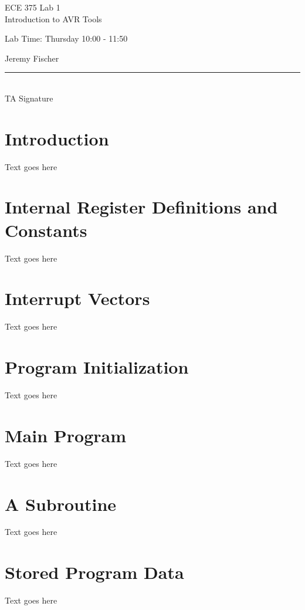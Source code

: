 \documentclass[12pt,letterpaper]{article}
\begin{document}
\begin{titlepage}
    \vspace*{4cm}
    \begin{flushright}
    {\huge
        ECE 375 Lab 1\\[1cm]
    }
    {\large
        Introduction to AVR Tools
    }
    \end{flushright}
    \begin{flushleft}
    Lab Time: Thursday 10:00 - 11:50
    \end{flushleft}
    \begin{flushright}
    Jeremy Fischer
    
    \vfill
    \rule{5in}{.5mm}\\
    TA Signature
    \end{flushright}

\end{titlepage}

\section{Introduction}
Text goes here

\section{Internal Register Definitions and Constants}
Text goes here

\section{Interrupt Vectors}
Text goes here

\section{Program Initialization}
Text goes here

\section{Main Program}
Text goes here

\section{A Subroutine}
Text goes here

\section{Stored Program Data}
Text goes here
\end{document}

